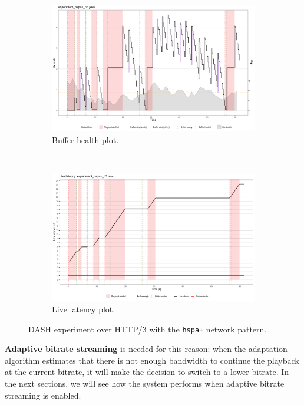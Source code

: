 \begin{figure}[h]
	\centering
	
	\begin{subfigure}[t]{0.45\textwidth}
		\centering
		\includegraphics[width=\textwidth]{res/eval_nonabr_hspa+_h3.png}
		\caption{Buffer health plot.}
		\label{fig:eval_nonabr_hspa+_h3_buffer}
	\end{subfigure}%
	~ 
	\begin{subfigure}[t]{0.45\textwidth}
		\centering
		\includegraphics[width=\textwidth]{res/eval_nonabr_hspa+_h3_latency.png}
		\caption{Live latency plot.}
		\label{fig:eval_nonabr_hspa+_h3_waterfall}
	\end{subfigure}
	
	\caption{DASH experiment over HTTP/3 with the \texttt{hspa+} network pattern.}
	\label{fig:eval_nonabr_hspa+_h3}
\end{figure}

\textbf{Adaptive bitrate streaming} is needed for this reason: when the adaptation algorithm estimates that there is not enough bandwidth to continue the playback at the current bitrate, it will make the decision to switch to a lower bitrate. In the next sections, we will see how the system performs when adaptive bitrate streaming is enabled.

